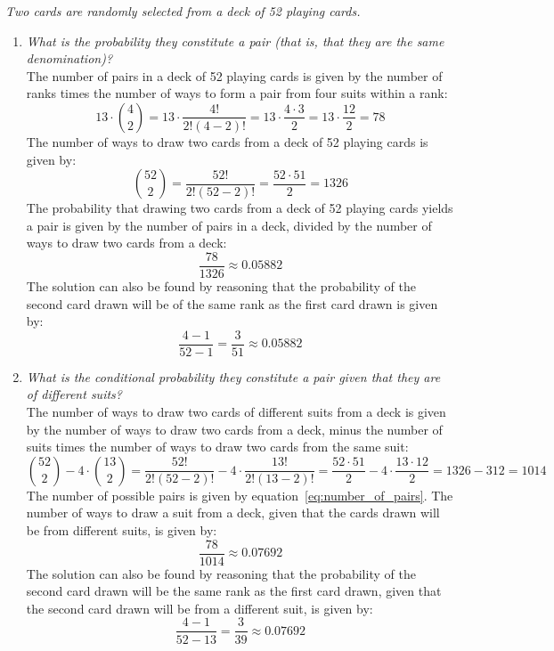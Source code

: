 \textit{Two cards are randomly selected from a deck of 52 playing cards.}

\begin{enumerate}[label=\alph*)]
\item \textit{What is the probability they constitute a pair (that is, that they are the same denomination)?}\\
The number of pairs in a deck of 52 playing cards is given by the number of ranks times the number of ways to form a pair from four suits within a rank:
\begin{equation}
\label{eq:number_of_pairs}
13 \cdot \binom{4}{2} =
13 \cdot \frac{4!}{2!(4 - 2)!} =
13 \cdot \frac{4 \cdot 3}{2} =
13 \cdot \frac{12}{2} =
78
\end{equation}
The number of ways to draw two cards from a deck of 52 playing cards is given by:
\begin{equation}
\binom{52}{2} =
\frac{52!}{2!(52 - 2)!} =
\frac{52 \cdot 51}{2} =
1326
\end{equation}
The probability that drawing two cards from a deck of 52 playing cards yields a pair is given by the number of pairs in a deck, divided by the number of ways to draw two cards from a deck:
\begin{equation}
\frac{78}{1326} \approx 0.05882
\end{equation}
The solution can also be found by reasoning that the probability of the second card drawn will be of the same rank as the first card drawn is given by:
\begin{equation}
\frac{4 - 1}{52 - 1} = \frac{3}{51} \approx 0.05882
\end{equation}
\item \textit{What is the conditional probability they constitute a pair given that they are of different suits?}\\
The number of ways to draw two cards of different suits from a deck is given by the number of ways to draw two cards from a deck, minus the number of suits times the number of ways to draw two cards from the same suit:
\begin{equation}
\binom{52}{2} - 4 \cdot \binom{13}{2} =
\frac{52!}{2!(52 - 2)!} - 4 \cdot \frac{13!}{2!(13 - 2)!} =
\frac{52 \cdot 51}{2} - 4 \cdot \frac{13 \cdot 12}{2} =
1326 - 312 =
1014
\end{equation}
The number of possible pairs is given by equation~\ref{eq:number_of_pairs}. The number of ways to draw a suit from a deck, given that the cards drawn will be from different suits, is given by:
\begin{equation}
\frac{78}{1014} \approx 0.07692
\end{equation}
The solution can also be found by reasoning that the probability of the second card drawn will be the same rank as the first card drawn, given that the second card drawn will be from a different suit, is given by:
\begin{equation}
\frac{4 - 1}{52 - 13} = \frac{3}{39} \approx 0.07692
\end{equation}
\end{enumerate}

